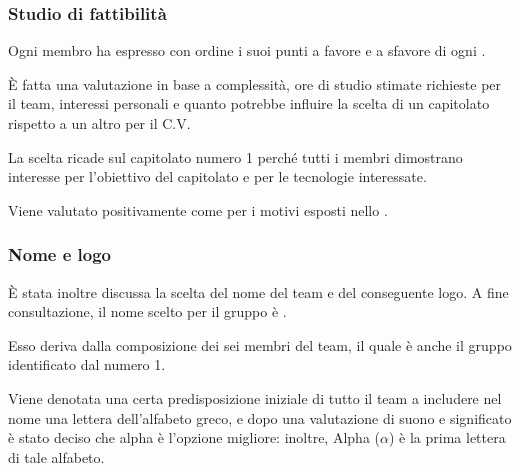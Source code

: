             \subsubsection{Studio di fattibilità}
            Ogni membro ha espresso con ordine i suoi punti a favore e a sfavore di ogni .\par
            È fatta una valutazione in base a complessità, ore di studio stimate richieste per il team, interessi personali e
            quanto potrebbe influire la scelta di un capitolato rispetto a un altro per il C.V.\par
            La scelta ricade sul capitolato numero 1 perché tutti i membri dimostrano interesse per l'obiettivo del capitolato
            e per le tecnologie interessate.\par
            Viene valutato positivamente come  per i motivi esposti nello \Doc{\SdFv}.

            \subsubsection{Nome e logo}
            È stata inoltre discussa la scelta del nome del team e del conseguente logo. A fine consultazione, il nome scelto
            per il gruppo è \textit{\gruppo}.\par
            Esso deriva dalla composizione dei sei membri del team, il quale è anche il gruppo identificato dal numero 1.\par
            Viene denotata una certa predisposizione iniziale di tutto il team a includere nel nome una lettera dell'alfabeto greco,
            e dopo una valutazione di suono e significato è stato deciso che alpha è l'opzione migliore: inoltre, Alpha ($\alpha$) è
            la prima lettera di tale alfabeto.

